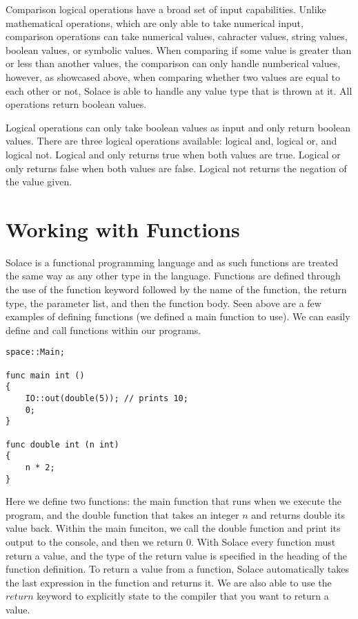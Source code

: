 \documentclass{article}
\begin{document}
Comparison logical operations have a broad set of input capabilities. Unlike mathematical operations, which are only able to take numerical input,
comparison operations can take numerical values, cahracter values, string values, boolean values, or symbolic values. When comparing if some value is
greater than or less than another values, the comparison can only handle numberical values, however, as showcased above, when comparing whether two
values are equal to each other or not, Solace is able to handle any value type that is thrown at it. All operations return boolean values.

Logical operations can only take boolean values as input and only return boolean values. There are three logical operations available: logical and,
logical or, and logical not. Logical and only returns true when both values are true. Logical or only returns false when both values are false.
Logical not returns the negation of the value given.


\section{Working with Functions}

Solace is a functional programming language and as such functions are treated the same way as any other type in the language. Functions are defined through
the use of the function keyword followed by the name of the function, the return type, the parameter list, and then the function body. Seen above are a few
examples of defining functions (we defined a main function to use). We can easily define and call functions within our programs.

\begin{lstlisting}
space::Main;

func main int ()
{
	IO::out(double(5)); // prints 10;
	0;
}

func double int (n int)
{
	n * 2;
}
\end{lstlisting}

Here we define two functions: the main function that runs when we execute the program, and the double function that takes an integer $n$ and returns
double its value back. Within the main funciton, we call the double function and print its output to the console, and then we return $0$. With Solace
every function must return a value, and the type of the return value is specified in the heading of the function definition. To return a value from
a function, Solace automatically takes the last expression in the function and returns it. We are also able to use the $return$ keyword to explicitly
state to the compiler that you want to return a value.
\end{document}
